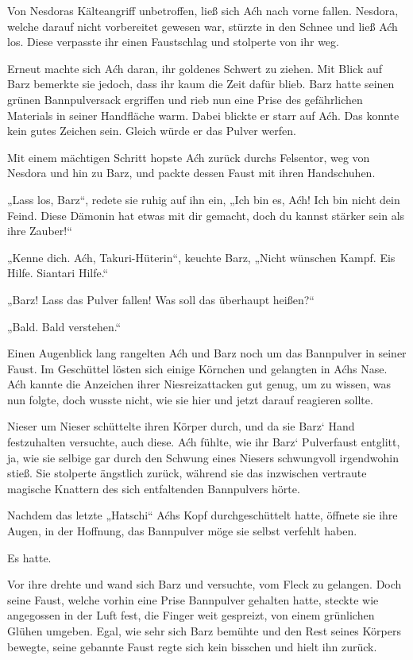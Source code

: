 Von Nesdoras Kälteangriff unbetroffen, ließ sich Aćh nach vorne fallen. Nesdora, welche darauf nicht vorbereitet gewesen war, stürzte in den Schnee und ließ Aćh los. Diese verpasste ihr einen Faustschlag und stolperte von ihr weg.

Erneut machte sich Aćh daran, ihr goldenes Schwert zu ziehen. Mit Blick auf Barz bemerkte sie jedoch, dass ihr kaum die Zeit dafür blieb. Barz hatte seinen grünen Bannpulversack ergriffen und rieb nun eine Prise des gefährlichen Materials in seiner Handfläche warm. Dabei blickte er starr auf Aćh. Das konnte kein gutes Zeichen sein. Gleich würde er das Pulver werfen.

Mit einem mächtigen Schritt hopste Aćh zurück durchs Felsentor, weg von Nesdora und hin zu Barz, und packte dessen Faust mit ihren Handschuhen.

„Lass los, Barz“, redete sie ruhig auf ihn ein, „Ich bin es, Aćh! Ich bin nicht dein Feind. Diese Dämonin hat etwas mit dir gemacht, doch du kannst stärker sein als ihre Zauber!“

„Kenne dich. Aćh, Takuri-Hüterin“, keuchte Barz, „Nicht wünschen Kampf. Eis Hilfe. Siantari Hilfe.“

„Barz! Lass das Pulver fallen! Was soll das überhaupt heißen?“

„Bald. Bald verstehen.“

Einen Augenblick lang rangelten Aćh und Barz noch um das Bannpulver in seiner Faust. Im Geschüttel lösten sich einige Körnchen und gelangten in Aćhs Nase. Aćh kannte die Anzeichen ihrer Niesreizattacken gut genug, um zu wissen, was nun folgte, doch wusste nicht, wie sie hier und jetzt darauf reagieren sollte.

Nieser um Nieser schüttelte ihren Körper durch, und da sie Barz‘ Hand festzuhalten versuchte, auch diese. Aćh fühlte, wie ihr Barz‘ Pulverfaust entglitt, ja, wie sie selbige gar durch den Schwung eines Niesers schwungvoll irgendwohin stieß. Sie stolperte ängstlich zurück, während sie das inzwischen vertraute magische Knattern des sich entfaltenden Bannpulvers hörte.

Nachdem das letzte „Hatschi“ Aćhs Kopf durchgeschüttelt hatte, öffnete sie ihre Augen, in der Hoffnung, das Bannpulver möge sie selbst verfehlt haben.

Es hatte.

Vor ihre drehte und wand sich Barz und versuchte, vom Fleck zu gelangen. Doch seine Faust, welche vorhin eine Prise Bannpulver gehalten hatte, steckte wie angegossen in der Luft fest, die Finger weit gespreizt, von einem grünlichen Glühen umgeben. Egal, wie sehr sich Barz bemühte und den Rest seines Körpers bewegte, seine gebannte Faust regte sich kein bisschen und hielt ihn zurück.

